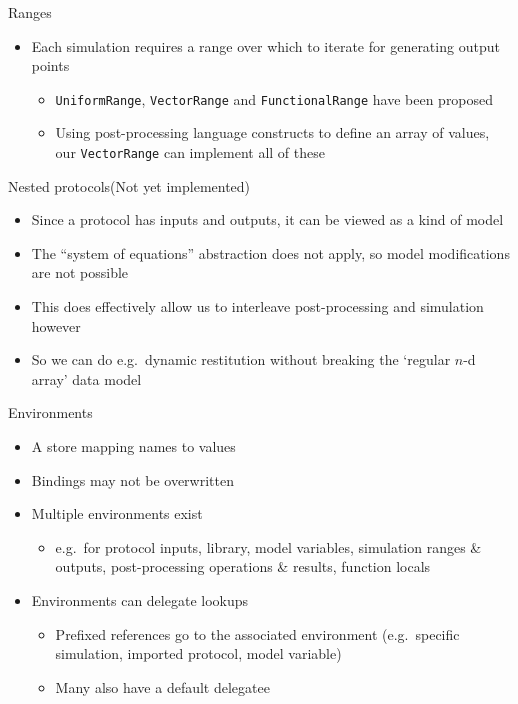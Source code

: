 \documentclass[t,xcolor={usenames,dvipsnames}]{beamer}
\newcommand{\subitem}[1]{\begin{itemize}[<.->]\item #1 \end{itemize}}
\begin{document}
\begin{frame}{Ranges}
\begin{itemize}
\item Each simulation requires a \alert{range} over which to iterate for generating output points
  \begin{itemize}
  \item \texttt{UniformRange}, \texttt{VectorRange} and \texttt{FunctionalRange} have been proposed
  \item Using post-processing language constructs to define an array of values, our \texttt{VectorRange} can implement all of these
  \end{itemize}
\end{itemize}
\end{frame}

\begin{frame}{Nested protocols}{\tiny (Not yet implemented)}
\begin{itemize}
\item Since a protocol has inputs and outputs, it can be viewed as a kind of model
\item The ``system of equations'' abstraction does not apply, so model modifications are not possible
\item This does effectively allow us to interleave post-processing and simulation however
\item So we can do e.g.\ dynamic restitution without breaking the `regular $n$-d array' data model
\end{itemize}
\end{frame}

\begin{frame}{Environments}
\begin{itemize}
\item A store mapping names to values
\item Bindings may not be overwritten
\item Multiple environments exist
  \subitem{e.g.\ for protocol inputs, library, model variables, simulation ranges \& outputs, post-processing operations \& results, function locals}
\item Environments can delegate lookups
  \begin{itemize}
  \item Prefixed references go to the associated environment (e.g.\ specific simulation, imported protocol, model variable)
  \item Many also have a default delegatee
  \end{itemize}
\end{itemize}
\end{frame}
\end{document}
